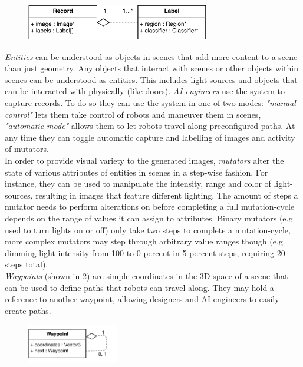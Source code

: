 \begin{figure}[b]
    \centering
    \includegraphics[width=8cm]{tex/img/ch04/Classes_Record.pdf}
    \label{fig:classes-record}
\end{figure}
\emph{Entities} can be understood as objects in scenes that add more content to a scene than just geometry. Any objects that interact with scenes or other objects within scenes can be understood as entities. This includes light-sources and objects that can be interacted with physically (like doors).
\emph{\acs{AI} engineers} use the system to capture records. To do so they can use the system in one of two modes: \emph{"manual control"} lets them take control of robots and maneuver them in scenes, \emph{"automatic mode"} allows them to let robots travel along preconfigured paths. At any time they can toggle automatic capture and labelling of images and activity of mutators.\\
In order to provide visual variety to the generated images, \emph{mutators} alter the state of various attributes of entities in scenes in a step-wise fashion. For instance, they can be used to manipulate the intensity, range and color of light-sources, resulting in images that feature different lighting. The amount of steps a mutator needs to perform alterations on before completing a full mutation-cycle depends on the range of values it can assign to attributes. Binary mutators (e.g. used to turn lights on or off) only take two steps to complete a mutation-cycle, more complex mutators may step through arbitrary value ranges though (e.g. dimming light-intensity from 100 to 0 percent in 5 percent steps, requiring 20 steps total). \\
\emph{Waypoints} (shown in \ref{fig:classes-waypoint}) are simple coordinates in the 3D space of a scene that can be used to define paths that robots can travel along. They may hold a reference to another waypoint, allowing designers and \acs{AI} engineers to easily create paths.  
\begin{figure}[t]
    \centering
    \includegraphics[width=4cm]{tex/img/ch04/Classes_Waypoint.pdf}
    \label{fig:classes-waypoint}
\end{figure}
